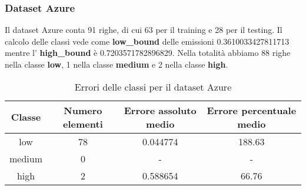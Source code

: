 \subsubsection{Dataset Azure}

Il dataset Azure conta 91 righe, di cui 63 per il training e 28 per il testing.
Il calcolo delle classi vede come \textbf{low\_bound} delle emissioni 0.3610033427811713 mentre l' \textbf{high\_bound} è 0.7203571782896829.
Nella totalità abbiamo 88 righe nella classe \textbf{low}, 1 nella classe \textbf{medium} e 2 nella classe \textbf{high}.


\begin{table}[H]
    \centering
    \begin{tabular}{|c|c|c|c|}
        \hline
        \textbf{Classe} &  \textbf{Numero elementi} & \textbf{Errore assoluto medio} & \textbf{Errore percentuale medio} \\ \hline
        low             & 78                & 0.044774                   & 188.63            \\ \hline
        medium          & 0                & -                  & -            \\ \hline
        high            & 2                & 0.588654                   & 66.76            \\ \hline
    \end{tabular}
    \caption{Errori delle classi per il dataset Azure}
\end{table}








